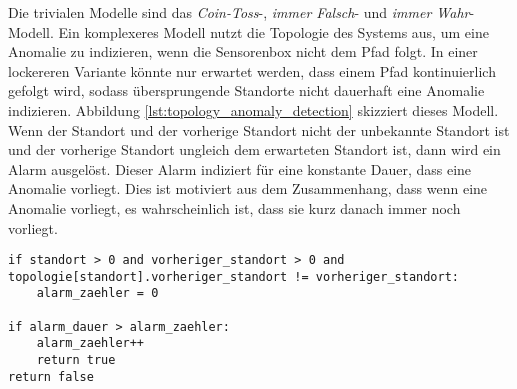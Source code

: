 Die trivialen Modelle sind das \textit{Coin-Toss}-, \textit{immer Falsch}- und \textit{immer Wahr}-Modell.
Ein komplexeres Modell nutzt die Topologie des Systems aus, um eine Anomalie zu indizieren, wenn die Sensorenbox nicht dem Pfad folgt.
In einer lockereren Variante könnte nur erwartet werden, dass einem Pfad kontinuierlich gefolgt wird,
sodass übersprungende Standorte nicht dauerhaft eine Anomalie indizieren.
Abbildung \ref{lst:topology_anomaly_detection} skizziert dieses Modell.
Wenn der Standort und der vorherige Standort nicht der unbekannte Standort ist und
der vorherige Standort ungleich dem erwarteten Standort ist, dann wird ein Alarm ausgelöst.
Dieser Alarm indiziert für eine konstante Dauer, dass eine Anomalie vorliegt.
Dies ist motiviert aus dem Zusammenhang, dass wenn eine Anomalie vorliegt, es wahrscheinlich ist, dass sie kurz danach immer noch vorliegt.
\begin{lstlisting}[label=lst:topology_anomaly_detection, caption={Skizze des Modells zur Anomalieerkennung auf Basis der Topologie.}]
if standort > 0 and vorheriger_standort > 0 and topologie[standort].vorheriger_standort != vorheriger_standort:
    alarm_zaehler = 0

if alarm_dauer > alarm_zaehler:
    alarm_zaehler++
    return true
return false
\end{lstlisting}
